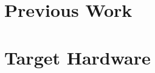 \documentclass[conference]{IEEEtran}
\begin{document}
\section{Previous Work}




\section{Target Hardware}
\end{document}
